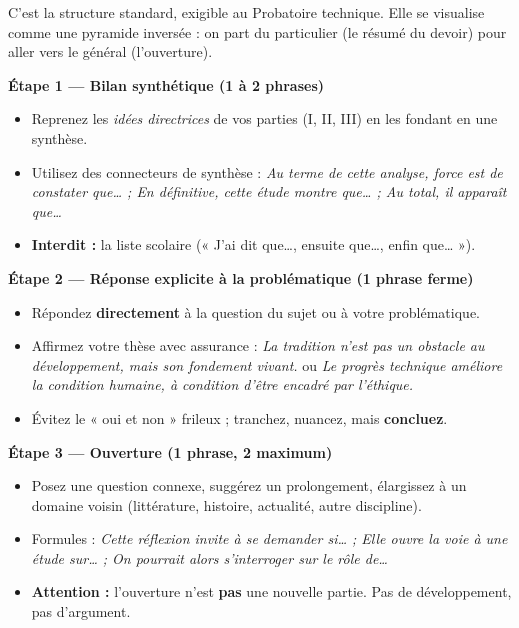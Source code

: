 \documentclass[11pt]{article}
\begin{document}
C'est la structure standard, exigible au Probatoire technique. Elle se visualise comme une pyramide inversée : on part du particulier (le résumé du devoir) pour aller vers le général (l'ouverture).

\begin{methode}
\textbf{Étape 1 — Bilan synthétique (1 à 2 phrases)}
\begin{itemize}
    \item Reprenez les \emph{idées directrices} de vos parties (I, II, III) en les fondant en une synthèse.
    \item Utilisez des connecteurs de synthèse : \emph{Au terme de cette analyse, force est de constater que… ; En définitive, cette étude montre que… ; Au total, il apparaît que…}
    \item \textbf{Interdit :} la liste scolaire (« J'ai dit que…, ensuite que…, enfin que… »).
\end{itemize}

\textbf{Étape 2 — Réponse explicite à la problématique (1 phrase ferme)}
\begin{itemize}
    \item Répondez \textbf{directement} à la question du sujet ou à votre problématique.
    \item Affirmez votre thèse avec assurance : \emph{La tradition n'est pas un obstacle au développement, mais son fondement vivant.} ou \emph{Le progrès technique améliore la condition humaine, à condition d'être encadré par l'éthique.}
    \item Évitez le « oui et non » frileux ; tranchez, nuancez, mais \textbf{concluez}.
\end{itemize}

\textbf{Étape 3 — Ouverture (1 phrase, 2 maximum)}
\begin{itemize}
    \item Posez une question connexe, suggérez un prolongement, élargissez à un domaine voisin (littérature, histoire, actualité, autre discipline).
    \item Formules : \emph{Cette réflexion invite à se demander si… ; Elle ouvre la voie à une étude sur… ; On pourrait alors s'interroger sur le rôle de…}
    \item \textbf{Attention :} l'ouverture n'est \textbf{pas} une nouvelle partie. Pas de développement, pas d'argument.
\end{itemize}
\end{methode}
\end{document}
